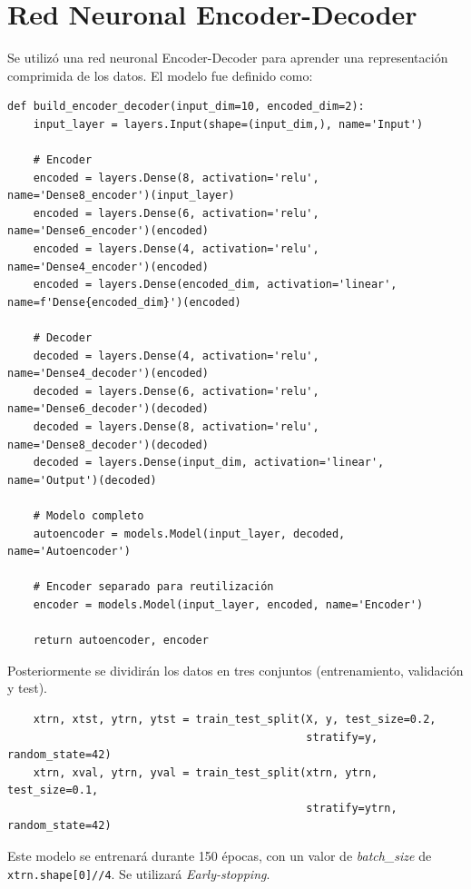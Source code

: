 \documentclass[paper=a4, fontsize=11pt]{scrartcl} %
\numberwithin{equation}{section} %
\numberwithin{figure}{section} %
\numberwithin{table}{section} %
\begin{document}
\section{Red Neuronal Encoder-Decoder}

Se utilizó una red neuronal Encoder-Decoder para aprender una representación comprimida de los datos. El modelo fue definido como:

\begin{verbatim}
def build_encoder_decoder(input_dim=10, encoded_dim=2):
    input_layer = layers.Input(shape=(input_dim,), name='Input')
    
    # Encoder
    encoded = layers.Dense(8, activation='relu', name='Dense8_encoder')(input_layer)
    encoded = layers.Dense(6, activation='relu', name='Dense6_encoder')(encoded)
    encoded = layers.Dense(4, activation='relu', name='Dense4_encoder')(encoded)
    encoded = layers.Dense(encoded_dim, activation='linear', name=f'Dense{encoded_dim}')(encoded)

    # Decoder
    decoded = layers.Dense(4, activation='relu', name='Dense4_decoder')(encoded)
    decoded = layers.Dense(6, activation='relu', name='Dense6_decoder')(decoded)
    decoded = layers.Dense(8, activation='relu', name='Dense8_decoder')(decoded)
    decoded = layers.Dense(input_dim, activation='linear', name='Output')(decoded)
    
    # Modelo completo
    autoencoder = models.Model(input_layer, decoded, name='Autoencoder')
    
    # Encoder separado para reutilización
    encoder = models.Model(input_layer, encoded, name='Encoder')

    return autoencoder, encoder

\end{verbatim}

Posteriormente se dividirán los datos en tres conjuntos (entrenamiento, validación y test). 

\begin{verbatim}
    xtrn, xtst, ytrn, ytst = train_test_split(X, y, test_size=0.2,
                                              stratify=y, random_state=42)
    xtrn, xval, ytrn, yval = train_test_split(xtrn, ytrn, test_size=0.1,
                                              stratify=ytrn, random_state=42)

\end{verbatim}

Este modelo se entrenará durante 150 épocas, con un valor de \textit{batch\_size} de \lstinline{xtrn.shape[0]//4}. Se utilizará \textit{Early-stopping}.
\end{document}
